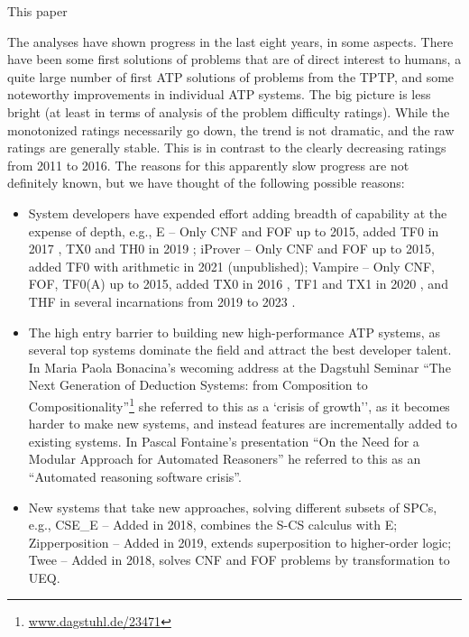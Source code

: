 \documentclass[runningheads]{llncs}
\begin{document}
This paper 

The analyses have shown progress in the last eight years, in some aspects. 
There have been some first solutions of problems that are of direct interest to humans, 
a quite large number of first ATP solutions of problems from the TPTP, and 
some noteworthy improvements in individual ATP systems.
The big picture is less bright (at least in terms of analysis of the problem difficulty ratings).
While the monotonized ratings necessarily go down, the trend is not dramatic, and the raw
ratings are generally stable.
This is in contrast to the clearly decreasing ratings from 2011 to 2016.
The reasons for this apparently slow progress are not definitely known, but we have thought of 
the following possible reasons:
\begin{itemize}
\item System developers have expended effort adding breadth of capability at the expense of 
      depth, e.g., 
      E -- Only CNF and FOF up to 2015, added TF0 in 2017 \cite{SCV19}, TX0 and TH0 in 2019 
           \cite{VB+19};
      iProver -- Only CNF and FOF up to 2015, added TF0 with arithmetic in 2021 (unpublished);
      Vampire -- Only CNF, FOF, TF0(A) up to 2015, added TX0 in 2016 \cite{KK+16}, 
           TF1 and TX1 in 2020 \cite{BR20-IJCAR}, and THF in several incarnations from 2019 to 
           2023 \cite{BR19,Bha20-Thesis,BRS23}.
\item The high entry barrier to building new high-performance ATP systems, as several top systems
      dominate the field and attract the best developer talent.
      In Maria Paola Bonacina's wecoming address at the Dagstuhl Seminar ``The Next Generation 
      of Deduction Systems: from Composition to Compositionality''\footnote{%
      \href{https://www.dagstuhl.de/23471}{www.dagstuhl.de/23471}} she referred to this as a
     `crisis of growth'', as it becomes harder to make new systems, and instead features are 
      incrementally added to existing systems.
      In Pascal Fontaine's presentation ``On the Need for a Modular Approach for Automated 
      Reasoners'' he referred to this as an ``Automated reasoning software crisis''.
\item New systems that take new approaches, solving different subsets of SPCs, e.g.,
      CSE\_E \cite{XL+18} -- Added in 2018, combines the S-CS calculus with E;
      Zipperposition \cite{BB+21} -- Added in 2019, extends superposition to higher-order logic;
      Twee \cite{Sma21} -- Added in 2018, solves CNF and FOF problems by transformation to UEQ.

\end{itemize}
\end{document}

